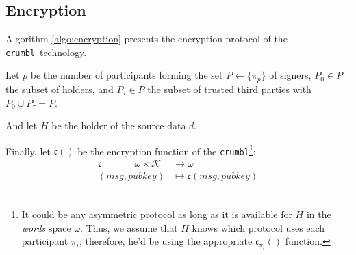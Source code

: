\documentclass[twoside,twocolumn]{article}
\theoremstyle{definition}
\theoremstyle{remark}
\begin{document}
\subsection{Encryption}

Algorithm \ref{algo:encryption} presents the encryption protocol of the \texttt{crumbl}\textregistered~technology.

\vspace{1em} %

Let $p$ be the number of participants forming the set $P \gets \{ \pi_p\}$ of signers, $P_0 \in P$ the subset of holders, and $P_\tau \in P$ the subset 
of trusted third parties with $P_0 \cup P_\tau = P$.

And let $H$ be the holder of the source data $d$.

Finally, let $\mathfrak{c}()$ be the encryption function of the \texttt{crumbl}\footnote{It could be any asymmetric protocol as long as it is available 
for $H$ in the \emph{words} space $\omega$. Thus, we assume that $H$ knows which protocol uses each participant $\pi_i$; therefore, he'd be using the 
appropriate $\mathfrak{c}_{\pi_i}()$ function.}:
\begin{equation}
    \label{eq:encrypt}
    \begin{array}{rl}
        \mathfrak{c}: \qquad \quad \omega \times \mathcal{K} &\to \omega \\
                (msg, pubkey) &\mapsto \mathfrak{c}(msg, pubkey) \\
    \end{array}
\end{equation}
\end{document}
